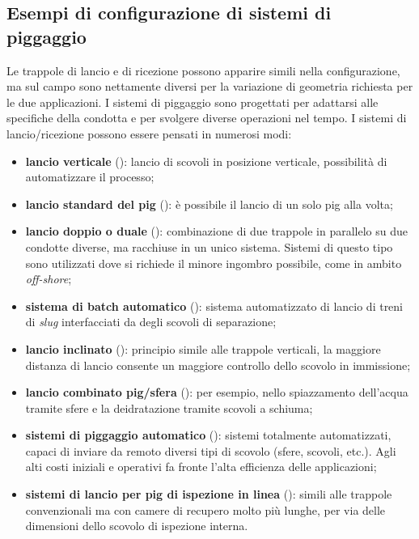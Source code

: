 \subsection{Esempi di configurazione di sistemi di piggaggio}
Le trappole di lancio e di ricezione possono apparire simili nella configurazione, ma sul campo sono nettamente diversi per la variazione di geometria richiesta per le due applicazioni. I sistemi di piggaggio sono progettati per adattarsi alle specifiche della condotta e per svolgere diverse operazioni nel tempo. I sistemi di lancio/ricezione possono essere pensati in numerosi modi:
\begin{itemize}
\item \textbf{lancio verticale} (): lancio di scovoli in posizione verticale, possibilità di automatizzare il processo;
\item \textbf{lancio standard del pig} (): è possibile il lancio di un solo pig alla volta;
\item \textbf{lancio doppio o duale} (): combinazione di due trappole in parallelo su due condotte diverse, ma racchiuse in un unico sistema. Sistemi di questo tipo sono utilizzati dove si richiede il minore ingombro possibile, come in ambito \textit{off-shore};
\item \textbf{sistema di batch automatico} (): sistema automatizzato di lancio di treni di \textit{slug} interfacciati da degli scovoli di separazione;
\item \textbf{lancio inclinato} (): principio simile alle trappole verticali, la maggiore distanza di lancio consente un maggiore controllo dello scovolo in immissione;
\item \textbf{lancio combinato pig/sfera} (): per esempio, nello spiazzamento dell'acqua tramite sfere e la deidratazione tramite scovoli a schiuma;
\item \textbf{sistemi di piggaggio automatico} (): sistemi totalmente automatizzati, capaci di inviare da remoto diversi tipi di scovolo (sfere, scovoli, etc.). Agli alti costi iniziali e operativi fa fronte l'alta efficienza delle applicazioni;
\item \textbf{sistemi di lancio per pig di ispezione in linea} (): simili alle trappole convenzionali ma con camere di recupero molto più lunghe, per via delle dimensioni dello scovolo di ispezione interna.
\end{itemize}

